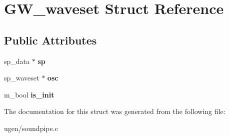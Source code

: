 \hypertarget{structGW__waveset}{}\section{G\+W\+\_\+waveset Struct Reference}
\label{structGW__waveset}
\subsection*{Public Attributes}
\begin{DoxyCompactItemize}
\item 
\hypertarget{structGW__waveset_aba2fff6ba9265e88a7b960ba8c0d979c}{}\label{structGW__waveset_aba2fff6ba9265e88a7b960ba8c0d979c} 
sp\+\_\+data $\ast$ {\bfseries sp}
\item 
\hypertarget{structGW__waveset_a5f40eb31bb7a459059fe1207121e9413}{}\label{structGW__waveset_a5f40eb31bb7a459059fe1207121e9413} 
sp\+\_\+waveset $\ast$ {\bfseries osc}
\item 
\hypertarget{structGW__waveset_a41db7502a141b46059d5fac729f9cef2}{}\label{structGW__waveset_a41db7502a141b46059d5fac729f9cef2} 
m\+\_\+bool {\bfseries is\+\_\+init}
\end{DoxyCompactItemize}


The documentation for this struct was generated from the following file\+:\begin{DoxyCompactItemize}
\item 
ugen/soundpipe.\+c\end{DoxyCompactItemize}
